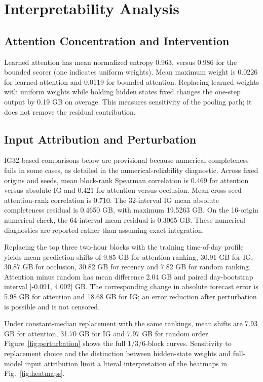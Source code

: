 \documentclass[conference]{IEEEtran}
\begin{document}
\section{Interpretability Analysis}
\subsection{Attention Concentration and Intervention}
Learned attention has mean normalized entropy 0.963, versus 0.986 for the bounded scorer (one indicates uniform weights). Mean maximum weight is 0.0226 for learned attention and 0.0119 for bounded attention. Replacing learned weights with uniform weights while holding hidden states fixed changes the one-step output by 0.19 GB on average. This measures sensitivity of the pooling path; it does not remove the residual contribution.

\subsection{Input Attribution and Perturbation}
IG32-based comparisons below are provisional because numerical completeness fails in some cases, as detailed in the numerical-reliability diagnostic. Across fixed origins and seeds, mean block-rank Spearman correlation is 0.469 for attention versus absolute IG and 0.421 for attention versus occlusion. Mean cross-seed attention-rank correlation is 0.710. The 32-interval IG mean absolute completeness residual is 0.4650 GB, with maximum 19.5263 GB. On the 16-origin numerical check, the 64-interval mean residual is 0.3065 GB. These numerical diagnostics are reported rather than assuming exact integration.

Replacing the top three two-hour blocks with the training time-of-day profile yields mean prediction shifts of 9.85 GB for attention ranking, 30.91 GB for IG, 30.87 GB for occlusion, 30.82 GB for recency and 7.82 GB for random ranking. Attention minus random has mean difference 2.04 GB and paired day-bootstrap interval [-0.091, 4.002] GB. The corresponding change in absolute forecast error is 5.98 GB for attention and 18.68 GB for IG; an error reduction after perturbation is possible and is not censored.

Under constant-median replacement with the same rankings, mean shifts are 7.93 GB for attention, 31.70 GB for IG and 7.97 GB for random order. Figure~\ref{fig:perturbation} shows the full 1/3/6-block curves. Sensitivity to replacement choice and the distinction between hidden-state weights and full-model input attribution limit a literal interpretation of the heatmaps in Fig.~\ref{fig:heatmaps}.
\end{document}
